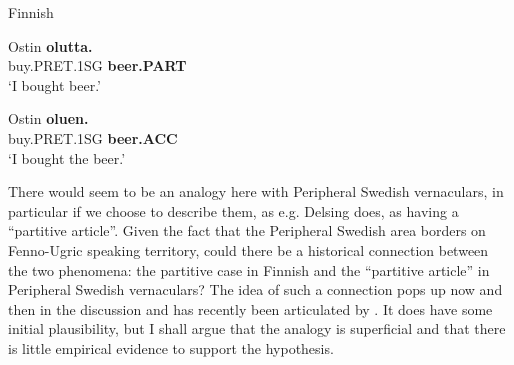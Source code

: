 \item 

Finnish



\item 


 \ea\label{}
\gll Ostin  \textbf{olutta.}\\


buy.PRET.1SG  \textbf{beer.PART}\\

\glt ‘I bought beer.’

\z

\item 


 \ea\label{}
\gll Ostin  \textbf{oluen.}\\


buy.PRET.1SG  \textbf{beer.ACC}\\

\glt  ‘I bought the beer.’

\z

There would seem to be an analogy here with Peripheral Swedish vernaculars, in particular if we choose to describe them, as e.g. Delsing does, as having a “partitive article”. Given the fact that the Peripheral Swedish area borders on Fenno-Ugric speaking territory, could there be a historical connection between the two phenomena: the partitive case in Finnish and the “partitive article” in Peripheral Swedish vernaculars? The idea of such a connection pops up now and then in the discussion and has recently been articulated by \citet{Riesler2002}. It does have some initial plausibility, but I shall argue that the analogy is superficial and that there is little empirical evidence to support the hypothesis.


